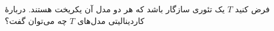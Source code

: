 فرض کنید $T$ یک تئوری سازگار باشد که هر دو مدل آن یکریخت هستند. دربارهٔ کاردینالیتی مدل‌های $T$ چه می‌توان گفت؟